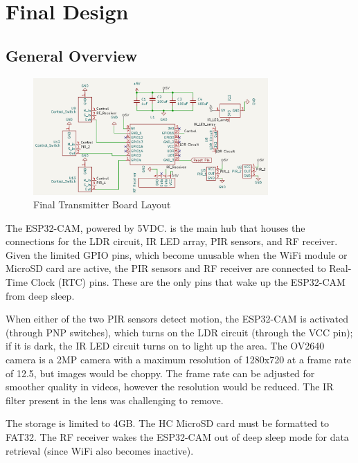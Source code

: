 \documentclass[class=report,11pt,crop=false]{standalone}
\begin{document}
\section{Final Design}

\subsection{General Overview}
\begin{figure}[ht]
\centering
\includegraphics[width=0.8\textwidth]{Images/Transmitter_layout.png}
\caption{Final Transmitter Board Layout}
\label{fig:my_label2}
\end{figure}

The ESP32-CAM, powered by 5VDC. is the main hub that houses the connections for the LDR circuit, IR LED array, PIR sensors, and RF receiver. 
Given the limited GPIO pins, which become unusable when the WiFi module or MicroSD card are active, the PIR sensors and RF receiver are connected to Real-Time Clock (RTC) pins. These are the only pins that wake up the ESP32-CAM from deep sleep. 

When either of the two PIR sensors detect motion, the ESP32-CAM is activated (through PNP switches), which turns on the LDR circuit (through the VCC pin); if it is dark, the IR LED circuit turns on to light up the area. The OV2640 camera is a 2MP camera with a maximum resolution of 1280x720 at a frame rate of 12.5, but images would be choppy. The frame rate can be adjusted for smoother quality in videos, however the resolution would be reduced. The IR filter present in the lens was challenging to remove. 

The storage is limited to 4GB. The HC MicroSD card must be formatted to FAT32. The RF receiver wakes the ESP32-CAM out of deep sleep mode for data retrieval (since WiFi also becomes inactive). 
\end{document}
